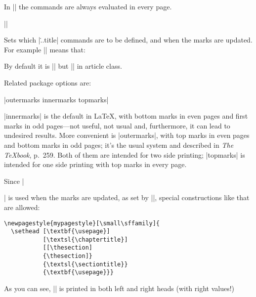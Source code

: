 \documentclass{ltxguide}
\begin{document}
In |\setfoot| the commands are always evaluated in every page.

\begin{decl}
||
\end{decl}
Sets which |\...title| commands are to be defined, and when the marks
are updated. For example 
||
means that:
By default it is 
|| but || in 
\textsf{article} class.

Related package options are:
\begin{decl}
|outermarks innermarks topmarks|
\end{decl}

|innermarks| is the default in \LaTeX, with bottom marks in even pages 
and first marks in odd pages---not useful, not usual and, furthermore, it
can lead to undesired results.  More 
convenient is |outermarks|, with top marks in even pages and bottom 
marks in odd pages; it's the usual system and described in \textit{The 
\TeX{}book}, p.~259.  Both of them are intended for two side printing; 
|topmarks| is intended for one side printing with top marks in every 
page.

Since |\markboth| is used when the marks are updated, as set by |\setmarks|,
special constructions like that are allowed:
\begin{verbatim}
\newpagestyle{mypagestyle}[\small\sffamily]{
  \sethead [\textbf{\usepage}] 
           [\textsl{\chaptertitle}]
           [[\thesection]
           {\thesection]} 
           {\textsl{\sectiontitle}}
           {\textbf{\usepage}}}
\end{verbatim}
As you can see, |\thesection| is printed in both left and right heads (with
right values!)
\end{document}
